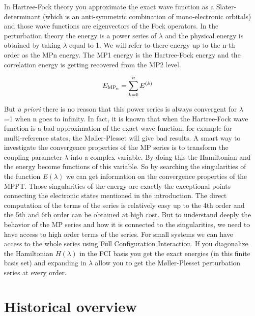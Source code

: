 \documentclass[11pt,a4paper]{article}
\begin{document}
In Hartree-Fock theory you approximate the exact wave function as a Slater-determinant (which is an anti-symmetric combination of mono-electronic orbitals) and those wave functions are eigenvectors of the Fock operators. In the perturbation theory the energy is a power series of $\lambda$ and the physical energy is obtained by taking $\lambda$ equal to 1. We will refer to there energy up to the n-th order as the MPn energy. The MP1 energy is the Hartree-Fock energy and the correlation energy is getting recovered from the MP2 level.

\begin{equation}
E_{\text{MP\textsubscript{n}}}= \sum_{k=0}^n E^{(k)}
\end{equation}

But \textit{a priori} there is no reason that this power series is always convergent for $\lambda$=1 when n goes to infinity. In fact, it is known that when the Hartree-Fock wave function is a bad approximation of the exact wave function, for example for multi-reference states, the M{\o}ller-Plesset will give bad results\cite{Gill_1986, Gill_1998, Handy_1985,Leininger_2000}. A smart way to investigate the convergence properties of the MP series is to transform the coupling parameter $\lambda$ into a complex variable. By doing this the Hamiltonian and the energy become functions of this variable. So by searching the singularities of the function $E(\lambda)$ we can get information on the convergence properties of the MPPT. Those singularities of the energy are exactly the exceptional points connecting the electronic states mentioned in the introduction. The direct computation of the terms of the series is relatively easy up to the 4th order and the 5th and 6th order can be obtained at high cost. But to understand deeply the behavior of the MP series and how it is connected to the singularities, we need to have access to high order terms of the series. For small systems we can have access to the whole series using Full Configuration Interaction. If you diagonalize the Hamiltonian $H(\lambda)$ in the FCI basis you get the exact energies (in this finite basis set) and expanding in $\lambda$ allow you to get the M{\o}ller-Plesset perturbation series at every order.

\section{Historical overview}
\end{document}
